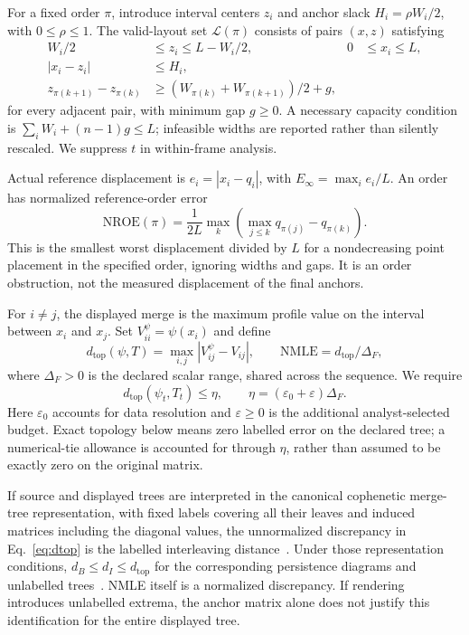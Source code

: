 \documentclass[10pt]{article}
\newcommand{\dtop}{d_{\mathrm{top}}}\newcommand{\nroe}{\mathrm{NROE}}
\begin{document}
For a fixed order $\pi$, introduce interval centers $z_i$ and anchor slack $H_i=\rho W_i/2$, with $0\le\rho\le1$. The valid-layout set $\mathcal{L}(\pi)$ consists of pairs $(x,z)$ satisfying
\begin{equation}\label{eq:layout}
\begin{aligned}
 W_i/2&\le z_i\le L-W_i/2, &0&\le x_i\le L,\\
 |x_i-z_i|&\le H_i,\\
 z_{\pi(k+1)}-z_{\pi(k)}&\ge
 (W_{\pi(k)}+W_{\pi(k+1)})/2+g,
\end{aligned}
\end{equation}
for every adjacent pair, with minimum gap $g\ge0$. A necessary capacity condition is $\sum_i W_i+(n-1)g\le L$; infeasible widths are reported rather than silently rescaled. We suppress $t$ in within-frame analysis.

Actual reference displacement is $e_i=|x_i-q_i|$, with $E_\infty=\max_i e_i/L$. An order has normalized reference-order error
\begin{equation}\label{eq:nroe}
 \nroe(\pi)=\frac{1}{2L}\max_k
 \left(\max_{j\le k}q_{\pi(j)}-q_{\pi(k)}\right).
\end{equation}
This is the smallest worst displacement divided by $L$ for a nondecreasing point placement in the specified order, ignoring widths and gaps. It is an order obstruction, not the measured displacement of the final anchors.

For $i\ne j$, the displayed merge is the maximum profile value on the interval between $x_i$ and $x_j$. Set $V_{ii}^{\psi}=\psi(x_i)$ and define
\begin{equation}\label{eq:dtop}
 \dtop(\psi,T)=\max_{i,j}|V_{ij}^{\psi}-V_{ij}|,
 \qquad\mathrm{NMLE}=\dtop/\Delta_F,
\end{equation}
where $\Delta_F>0$ is the declared scalar range, shared across the sequence. We require
\begin{equation}\label{eq:budget}
 \dtop(\psi_t,T_t)\le\eta,
 \qquad\eta=(\varepsilon_0+\varepsilon)\Delta_F.
\end{equation}
Here $\varepsilon_0$ accounts for data resolution and $\varepsilon\ge0$ is the additional analyst-selected budget. Exact topology below means zero labelled error on the declared tree; a numerical-tie allowance is accounted for through $\eta$, rather than assumed to be exactly zero on the original matrix.

If source and displayed trees are interpreted in the canonical cophenetic merge-tree representation, with fixed labels covering all their leaves and induced matrices including the diagonal values, the unnormalized discrepancy in Eq.~\ref{eq:dtop} is the labelled interleaving distance~\cite{Munch:2019:LINF,Gasparovic:2024:IID}. Under those representation conditions, $d_B\le d_I\le\dtop$ for the corresponding persistence diagrams and unlabelled trees~\cite{Gasparovic:2024:IID,Morozov:2013:IDMT}. NMLE itself is a normalized discrepancy. If rendering introduces unlabelled extrema, the anchor matrix alone does not justify this identification for the entire displayed tree.
\end{document}
